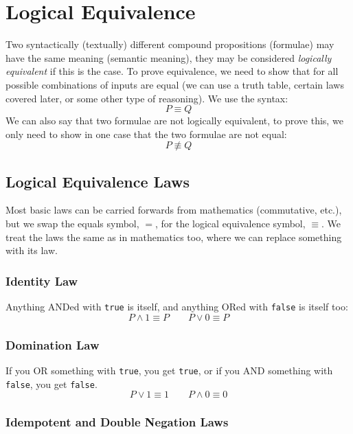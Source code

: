 \section{Logical Equivalence}\label{sec:logical_equivelance}

Two syntactically (textually) different compound propositions (formulae) may have the same meaning (semantic meaning), they may be considered \emph{logically equivalent} if this is the case.
To prove equivalence,  we need to show that for all possible combinations of inputs are equal (we can use a truth table, certain laws covered later, or some other type of reasoning).
We use the syntax:
\[
    P \equiv Q
\]
We can also say that two formulae are not logically equivalent, to prove this, we only need to show in one case that the two formulae are not equal:
\[
    P \not\equiv Q
\]

\subsection{Logical Equivalence Laws}\label{sub:logical_equivalence_laws}

Most basic laws can be carried forwards from mathematics (commutative, etc.), but we swap the equals symbol, \(=\), for the logical equivalence symbol, \(\equiv\).
We treat the laws the same as in mathematics too, where we can replace something with its law.

\subsubsection{Identity Law}\label{ssub:leequiv_identity}

Anything ANDed with \texttt{true} is itself, and anything ORed with \texttt{false} is itself too:
\[
    P \land 1 \equiv P \qquad P \lor 0 \equiv P
\]

\subsubsection{Domination Law}\label{ssub:domination_lequiv}

If you OR something with \texttt{true}, you get \texttt{true}, or if you AND something with \texttt{false}, you get \texttt{false}.
\[
    P \lor 1 \equiv 1 \qquad P \land 0 \equiv 0
\]

\subsubsection{Idempotent and Double Negation Laws}\label{ssub:idempotent_and_double_negation_laws}

